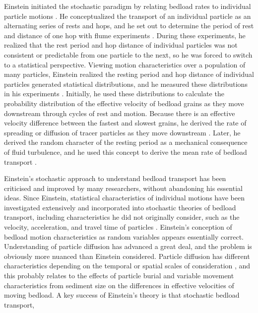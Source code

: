 \documentclass{article}
\begin{document}
Einstein initiated the stochastic paradigm by relating bedload rates to individual particle motions \citep{Einstein1942, Einstein1950}.
He conceptualized the transport of an individual particle as an alternating series of rests and hops, and he set out to determine the period of rest and distance of one hop with flume experiments \citep{Einstein1937}. 
During these experiments, he realized that the rest period and hop distance of individual particles was not consistent or predictable from one particle to the next, so he was forced to switch to a statistical perspective. 
Viewing motion characteristics over a population of many particles, Einstein realized the resting period and hop distance of individual particles generated statistical distributions, and he measured these distributions in his experiments \citep{Einstein1937}. 
Initially, he used these distributions to calculate the probability distribution of the effective velocity of bedload grains as they move downstream through cycles of rest and motion. 
Because there is an effective velocity difference between the fastest and slowest grains, he derived the rate of spreading or diffusion of tracer particles as they move downstream \citep{Einstein1937}. 
Later, he derived the random character of the resting period as a mechanical consequence of fluid turbulence, and he used this concept to derive the mean rate of bedload transport \citep{Einstein1950}.

Einstein's stochastic approach to understand bedload transport has been criticised and improved by many researchers, without abandoning his essential ideas. 
Since Einstein, statistical characteristics of individual motions have been investigated extensively and incorporated into stochastic theories of bedload transport, including characteristics he did not originally consider, such as the velocity, acceleration, and travel time of particles \citep{Hubbell1964, Yano1969, Nakagawa1976, Hassan1991, Habersack2001, Ancey2008, Roseberry2012, Fathel2015, Heyman2016}.
Einstein's conception of bedload motion characteristics as random variables appears essentially correct.
Understanding of particle diffusion has advanced a great deal, and the problem is obviously more nuanced than Einstein considered.  
Particle diffusion has different characteristics depending on the temporal or spatial scales of consideration \citep{Nikora2002, Zhang2012, Martin2012}, and this probably relates to the effects of particle burial \citep{Sayre1971, Nakagawa1980, Voepel2013, Martin2014, Bradley2017} and variable movement characteristics from sediment size \citep{Fan2017} on the differences in effective velocities of moving bedload. 
A key success of Einstein's theory is that stochastic bedload transport, 
\end{document}
